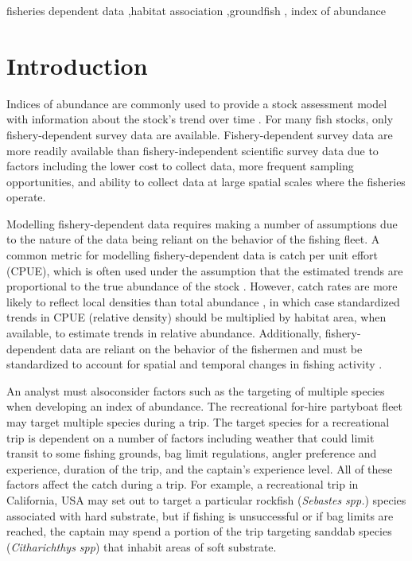 \documentclass[
  12pt,
  authoryear,
  preprint,
  3p]{elsarticle}
\begin{document}
\begin{frontmatter}
\begin{keyword}
    fisheries dependent data \sep habitat
association \sep groundfish \sep 
    index of abundance
\end{keyword}
\end{frontmatter}\ifdefined\Shaded\renewenvironment{Shaded}{\begin{tcolorbox}[boxrule=0pt, sharp corners, interior hidden, frame hidden, enhanced, breakable, borderline west={3pt}{0pt}{shadecolor}]}{\end{tcolorbox}}\fi

\hypertarget{introduction}{%
\section{Introduction}\label{introduction}}

Indices of abundance are commonly used to provide a stock assessment
model with information about the stock's trend over time
\citep{Harley:2001:CUE, Hilborn:1992:QFS}. For many fish stocks, only
fishery-dependent survey data are available. Fishery-dependent survey
data are more readily available than fishery-independent scientific
survey data due to factors including the lower cost to collect data,
more frequent sampling opportunities, and ability to collect data at
large spatial scales where the fisheries operate.

Modelling fishery-dependent data requires making a number of assumptions
due to the nature of the data being reliant on the behavior of the
fishing fleet. A common metric for modelling fishery-dependent data is
catch per unit effort (CPUE), which is often used under the assumption
that the estimated trends are proportional to the true abundance of the
stock \citep{Maunder:2004:SCE}. However, catch rates are more likely to
reflect local densities than total abundance
\citep{Haggarty:2006:CIR, Schnute:1995:IEP}, in which case standardized
trends in CPUE (relative density) should be multiplied by habitat area,
when available, to estimate trends in relative abundance. Additionally,
fishery-dependent data are reliant on the behavior of the fishermen and
must be standardized to account for spatial and temporal changes in
fishing activity \citep{Campbell:2004:CSA, Hilborn:1992:QFS}.

An analyst must alsoconsider factors such as the targeting of multiple
species when developing an index of abundance. The recreational for-hire
partyboat fleet may target multiple species during a trip. The target
species for a recreational trip is dependent on a number of factors
including weather that could limit transit to some fishing grounds, bag
limit regulations, angler preference and experience, duration of the
trip, and the captain's experience level. All of these factors affect
the catch during a trip. For example, a recreational trip in California,
USA may set out to target a particular rockfish (\emph{Sebastes spp.})
species associated with hard substrate, but if fishing is unsuccessful
or if bag limits are reached, the captain may spend a portion of the
trip targeting sanddab species (\emph{Citharichthys spp}) that inhabit
areas of soft substrate.
\end{document}

